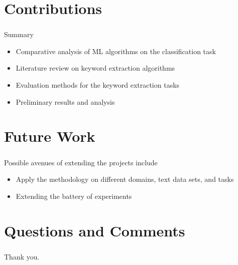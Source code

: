 \documentclass{beamer}
\begin{document}
\section{Contributions}
\frametitle{\phantom{ }}
\begin{frame}{Summary}

\begin{itemize}
\item Comparative analysis of ML algorithms on the classification task
\item Literature review on keyword extraction algorithms
\item Evaluation methods for the keyword extraction tasks
\item Preliminary results and analysis
	
\end{itemize}

\end{frame}




\section{Future Work}

\begin{frame}
\frametitle{\phantom{ }}

Possible avenues of extending the projects include
\begin{itemize}
    \item Apply the methodology on different domains, text data sets, and tasks
    \item Extending the battery of experiments
\end{itemize}

\end{frame}





\section{Questions and Comments}

\begin{frame}[c]

\frametitle{\phantom{ }}

\centering
\Huge
Thank you.

\end{frame}
\end{document}
